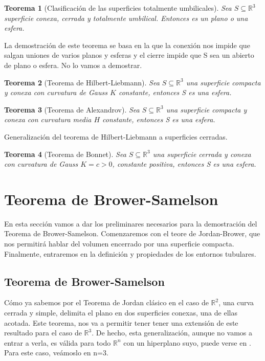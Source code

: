 \documentclass[paper=a4, fontsize=11pt, spanish]{scrartcl}
\newcommand{\rmath}{\mathbb{R}}
\newcommand{\rdos}{\mathbb{R}^2}
\newcommand{\rtres}{\mathbb{R}^3}
\newtheorem{theorem}{Teorema}[section]
\theoremstyle{definition}
\theoremstyle{definition}
\theoremstyle{definition}
\begin{document}
\begin{theorem}[Clasificación de las superficies totalmente umbilicales]
Sea $S \subseteq \rtres$ superficie conexa, cerrada y totalmente umbilical. Entonces es un plano o una esfera.
\end{theorem}

La demostración de este teorema se basa en la que la conexión nos impide que salgan uniones de varios planos y esferas y el cierre impide que S sea un abierto de plano o esfera. No lo vamos a demostrar.

\begin{theorem}[Teorema de Hilbert-Liebmann]
Sea $S \subseteq \rtres$ una superficie compacta y conexa con curvatura de Gauss $K$ constante, entonces S es una esfera.
\end{theorem}


\begin{theorem}[Teorema de Alexandrov]
Sea $S \subseteq \rtres$ una superficie compacta y conexa con curvatura media $H$ constante, entonces S es una esfera.
\end{theorem}

Generalización del teorema de Hilbert-Liebmann a superficies cerradas.
\begin{theorem}[Teorema de Bonnet]
Sea $S \subseteq \rtres$ una superficie cerrada y conexa con curvatura de Gauss $K=c>0$, constante positiva, entonces S es una esfera.
\end{theorem}


\section{Teorema de Brower-Samelson}

En esta sección vamos a dar los preliminares necesarios para la demostración del Teorema de Brower-Samelson. Comenzaremos con el teore de Jordan-Brower, que nos permitirá hablar del volumen encerrado por una superficie compacta. Finalmente, entraremos en la definición y propiedades de los entornos tubulares.


\subsection{Teorema de Brower-Samelson}
Cómo ya sabemos por el Teorema de Jordan clásico en el caso de $\rdos$, una curva cerrada y simple, delimita el plano en dos superficies conexas, una de ellas acotada. Este teorema, nos va a permitir tener tener una extensión de este resultado para el caso de $\rtres$. De hecho, esta generalización, aunque no vamos a entrar a verla, es válida para todo $\rmath^n$ con un hiperplano suyo, puede verse en \cite{paperchicago}. Para este caso, veámoslo en n=3.
\end{document}
